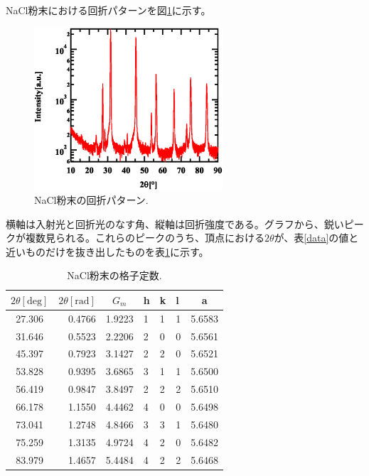 \documentclass[11pt,a4j,uplatex]{jsarticle}
\begin{document}
NaCl粉末における回折パターンを図\ref{powder}に示す。

\begin{figure}[htb]
 \centering
 \includegraphics[clip,width=7cm]{FigPowder.eps}
 \caption{NaCl粉末の回折パターン.}
 \label{powder}
\end{figure}

横軸は入射光と回折光のなす角、縦軸は回折強度である。グラフから、鋭いピークが複数見られる。これらのピークのうち、頂点における$2\theta$が、表\ref{data}の値と近いものだけを抜き出したものを表\ref{pow}に示す。

\begin{table}[htbp]
 \begin{center}
  \caption{NaCl粉末の格子定数.}
  \begin{tabular}{|c|r|c|lll|c|}  \hline
   $2\theta[\mathrm{deg}]$ & \multicolumn{1}{c|}{$2\theta[\mathrm{rad}]$} & $G_{m}$     & h & k & l & a           \\ \hline  \hline
   27.306 & 0.4766  & 1.9223 & 1 & 1 & 1 & 5.6583\\
   31.646 & 0.5523  & 2.2206 & 2 & 0 & 0 & 5.6561\\
   45.397 & 0.7923  & 3.1427 & 2 & 2 & 0 & 5.6521\\
   53.828 & 0.9395  & 3.6865 & 3 & 1 & 1 & 5.6500\\
   56.419 & 0.9847  & 3.8497 & 2 & 2 & 2 & 5.6510\\
   66.178 & 1.1550  & 4.4462 & 4 & 0 & 0 & 5.6498\\
   73.041 & 1.2748  & 4.8466 & 3 & 3 & 1 & 5.6480\\
   75.259 & 1.3135  & 4.9724 & 4 & 2 & 0 & 5.6482\\
   83.979 & 1.4657  & 5.4484 & 4 & 2 & 2 & 5.6468\\\hline
  \end{tabular}
  \label{pow}
 \end{center}
\end{table}
\end{document}
